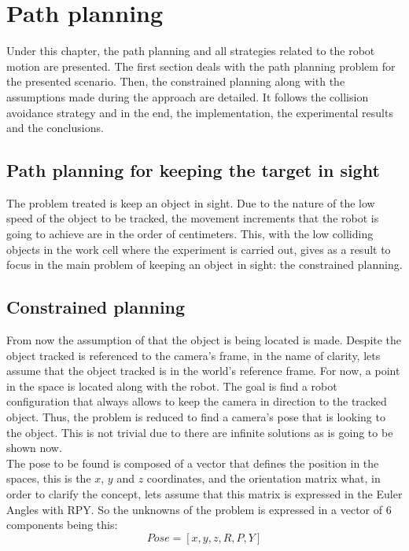\chapter{Path planning} %
\label{chap:path_planning}

Under this chapter, the path planning and all strategies related to the robot motion are presented.
The first section deals with the path planning problem for the presented scenario. 
Then, the constrained planning along with the assumptions made during the approach are detailed. 
It follows the collision avoidance strategy and in the end, the implementation, the experimental results and the conclusions.

\section{Path planning for keeping the target in sight} %
\label{sec:path_planning_in_keep_object_in_sight}
The problem treated is keep an object in sight. 
Due to the nature of the low speed of the object to be tracked, the movement increments that the robot is going to achieve are in the order of centimeters. 
This, with the low colliding objects in the work cell where the experiment is carried out, gives as a result to focus in the main problem of keeping an object in sight: the constrained planning.

\section{Constrained planning} %
\label{sec:constrained_planning}
From now the assumption of that the object is being located is made. 
Despite the object tracked is referenced to the camera's frame, in the name of clarity, lets assume that the object tracked is in the world's reference frame. 
For now, a point in the space is located along with the robot.
The goal is find a robot configuration that always allows to keep the camera in direction to the tracked object.
Thus, the problem is reduced to find a camera's pose that is looking to the object.
This is not trivial due to there are infinite solutions as is going to be shown now. \\

The pose to be found is composed of a vector that defines the position in the spaces, this is the $x$, $y$ and $z$ coordinates, and the orientation matrix what, in order to clarify the concept, lets assume that this matrix is expressed in the Euler Angles with RPY. So the unknowns of the problem is expressed in a vector of 6 components being this:
	\begin{equation}
	\label{eq:pose_cartesian_coordinates}
		Pose = [x,y,z,R,P,Y]
	\end{equation}

